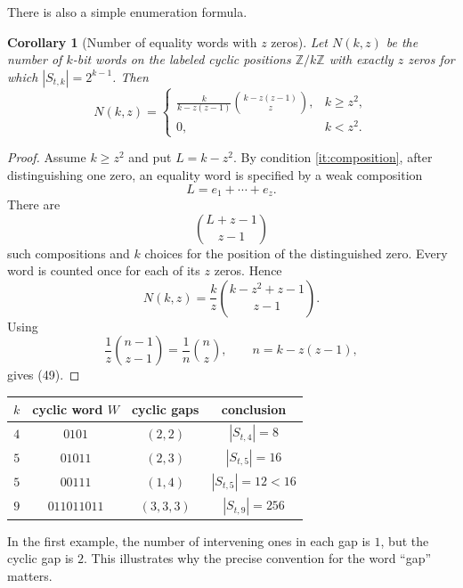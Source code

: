 \documentclass[11pt]{article}
\newtheorem{corollary}[theorem]{Corollary}
\begin{document}
There is also a simple enumeration formula.

\begin{corollary}[Number of equality words with $z$ zeros]
Let $N(k,z)$ be the number of $k$-bit words on the labeled cyclic
positions $\mathbb Z/k\mathbb Z$ with exactly $z$ zeros for which $|S_{t,k}|=2^{k-1}$.  Then
\[
N(k,z)=
\begin{cases}
\displaystyle
 \frac{k}{k-z(z-1)}
 \binom{k-z(z-1)}{z},&k\geq z^2,\\[2ex]
0,&k<z^2.
\end{cases}                                                   \tag{49}
\]
\end{corollary}

\begin{proof}
Assume $k\geq z^2$ and put $L=k-z^2$.  By condition
\ref{it:composition}, after distinguishing one zero, an equality word
is specified by a weak composition
\[
                         L=e_1+\cdots+e_z.
\]
There are
\[
                         \binom{L+z-1}{z-1}
\]
such compositions and $k$ choices for the position of the distinguished
zero.  Every word is counted once for each of its $z$ zeros.  Hence
\[
 N(k,z)=\frac{k}{z}\binom{k-z^2+z-1}{z-1}.
\]
Using
\[
 \frac1z\binom{n-1}{z-1}=\frac1n\binom nz,
 \qquad n=k-z(z-1),
\]
gives (49).
\end{proof}

\begin{center}
\begin{tabular}{cccc}
\toprule
$k$ & cyclic word $W$ & cyclic gaps & conclusion\\
\midrule
$4$ & $0101$      & $(2,2)$     & $|S_{t,4}|=8$\\
$5$ & $01011$     & $(2,3)$     & $|S_{t,5}|=16$\\
$5$ & $00111$     & $(1,4)$     & $|S_{t,5}|=12<16$\\
$9$ & $011011011$ & $(3,3,3)$   & $|S_{t,9}|=256$\\
\bottomrule
\end{tabular}
\end{center}

In the first example, the number of intervening ones in each gap is
$1$, but the cyclic gap is $2$.  This illustrates why the
precise convention for the word ``gap'' matters.
\end{document}
